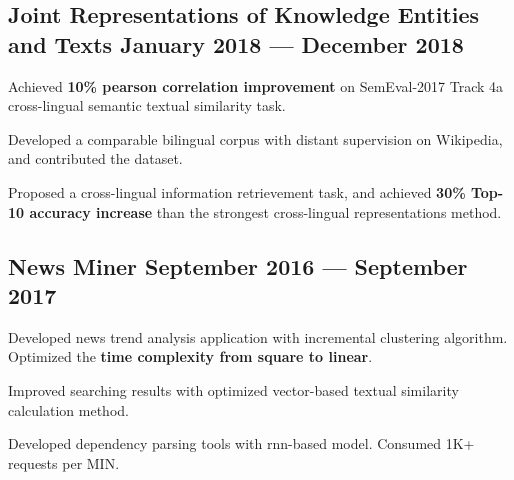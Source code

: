 \subsection*{Joint Representations of Knowledge Entities and Texts \hfill January 2018 --- December 2018} 
    \begin{zitemize}
        \item Achieved \textbf{10\% pearson correlation improvement} on SemEval-2017 Track 4a cross-lingual semantic textual similarity task.
        \item Developed a comparable bilingual corpus with distant supervision on Wikipedia, and contributed the dataset.
        \item Proposed a cross-lingual information retrievement task, and achieved \textbf{30\% Top-10 accuracy increase} than the strongest cross-lingual representations method.
    \end{zitemize}


\subsection*{News Miner \hfill September 2016 --- September 2017} 
    \begin{zitemize}
        \item Developed news trend analysis application with incremental clustering algorithm. Optimized the \textbf{time complexity from square to linear}.
        \item Improved searching results with optimized vector-based textual similarity calculation method.
        \item Developed dependency parsing tools with rnn-based model. Consumed 1K+ requests per MIN.
    \end{zitemize}

